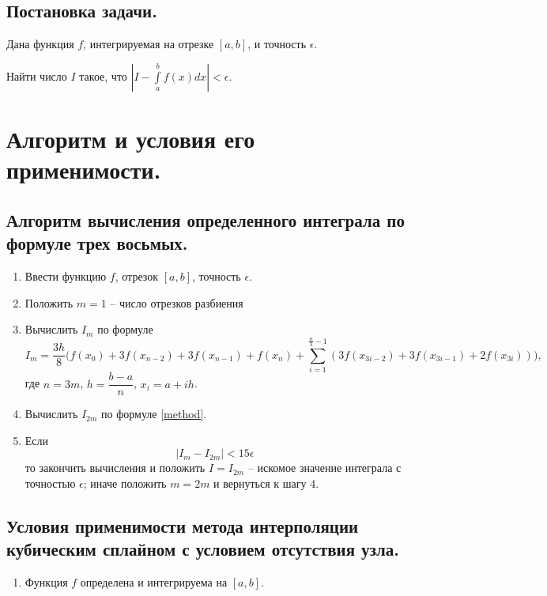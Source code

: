 \documentclass[a4paper, 12pt]{article}
\begin{document}
	\subsection{Постановка задачи.}
	
	Дана функция $f$, интегрируемая на отрезке $[a,b]$, и точность $\epsilon$. 
	
	Найти число $I$ такое, что $\displaystyle|I-\int\limits_a^bf(x)dx|<\epsilon$.
	
	\section{Алгоритм и условия его применимости.}
	
	\subsection{Алгоритм вычисления определенного интеграла по формуле трех восьмых.}
	
	\begin{enumerate}
		\item Ввести функцию $f$, отрезок $[a,b]$, точность $\epsilon$.
		\item Положить $m=1$ -- число отрезков разбиения
		\item Вычислить $I_m$ по формуле
		\begin{equation} \label{method}
			I_m=\frac{3h}{8}\bigg(f(x_0)+3f(x_{n-2})+3f(x_{n-1})+f(x_n)+\sum\limits_{i=1}^{\frac{n}{3}-1}(3f(x_{3i-2})+3f(x_{3i-1})+2f(x_{3i}))\bigg),
		\end{equation}
		где $n=3m$, $h=\dfrac{b-a}{n}$, $x_i=a+ih$.
		\item Вычислить $I_{2m}$ по формуле \eqref{method}.
		\item Если
		\begin{equation}
			|I_m-I_{2m}|<15\epsilon
		\end{equation}
		то закончить вычисления и положить $I=I_{2m}$ -- искомое значение интеграла с точностью $\epsilon$; иначе положить $m=2m$ и вернуться к шагу 4.
	\end{enumerate}
	
	\subsection{Условия применимости метода интерполяции кубическим сплайном с условием отсутствия узла.}
	
	\begin{enumerate}
		\item Функция $f$ определена и интегрируема на $[a,b]$.
	\end{enumerate}
	
\end{document}
